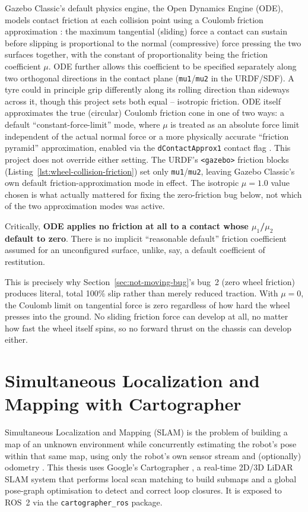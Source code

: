 Gazebo Classic's default physics engine, the Open Dynamics Engine
(ODE), models contact friction at each collision point using a
Coulomb friction approximation \cite{oderelease}: the maximum
tangential (sliding) force a contact can sustain before slipping is
proportional to the normal (compressive) force pressing the two
surfaces together, with the constant of proportionality being the
friction coefficient $\mu$. ODE further allows this coefficient to be
specified separately along two orthogonal directions in the contact
plane (\texttt{mu1}/\texttt{mu2} in the URDF/SDF). A tyre could in
principle grip differently along its rolling direction than sideways
across it, though this project sets both equal -- isotropic
friction. ODE itself approximates the true (circular)
Coulomb friction cone in one of two ways: a default ``constant-force-limit''
mode, where $\mu$ is treated as an absolute force limit independent
of the actual normal force or a more physically accurate ``friction
pyramid'' approximation, enabled via the \texttt{dContactApprox1}
contact flag \cite{oderelease}. This project does not override
either setting. The URDF's \texttt{<gazebo>} friction blocks
(Listing~\ref{lst:wheel-collision-friction}) set only
\texttt{mu1}/\texttt{mu2}, leaving Gazebo Classic's own default
friction-approximation mode in effect. The isotropic $\mu=1.0$ value
chosen is what actually mattered for fixing the zero-friction bug
below, not which of the two approximation modes was active.

Critically, \textbf{ODE applies no friction at all to a contact whose
$\mu_1$/$\mu_2$ default to zero}. There is no implicit ``reasonable
default'' friction coefficient assumed for an unconfigured surface,
unlike, say, a default coefficient of restitution.

This is precisely why Section~\ref{sec:not-moving-bug}'s bug~2 (zero
wheel friction) produces literal, total 100\% slip rather than
merely reduced traction. With $\mu = 0$, the Coulomb limit on
tangential force is zero regardless of how hard the wheel presses
into the ground. No sliding friction force can develop at all, no
matter how fast the wheel itself spins, so no forward thrust on the
chassis can develop either.

\section{Simultaneous Localization and Mapping with Cartographer}
\label{sec:cartographer}

Simultaneous Localization and Mapping (SLAM) is the problem of
building a map of an unknown environment while concurrently
estimating the robot's pose within that same map, using only the
robot's own sensor stream and (optionally) odometry
\cite{cadena2016slam}. This thesis uses
Google's Cartographer \cite{hess2016cartographer}, a real-time 2D/3D
LiDAR SLAM system that performs local scan matching to build
submaps and a global pose-graph optimisation to detect and correct
loop closures. It is exposed to ROS~2 via the
\texttt{cartographer\_ros} package.

